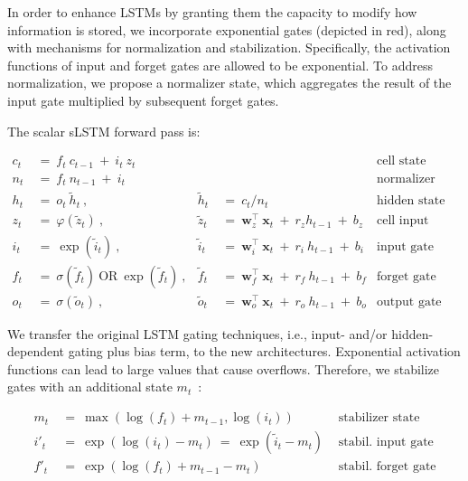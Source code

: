 In order to enhance LSTMs by granting them the capacity to modify how information is stored, we incorporate exponential gates (depicted in red), along with mechanisms for normalization and stabilization. Specifically, the activation functions of input and forget gates are allowed to be exponential. To address normalization, we propose a normalizer state, which aggregates the result of the input gate multiplied by subsequent forget gates.

The scalar sLSTM forward pass is:

\begin{align}
\label{eq:slstmforward}
c_t \ &= \  f_t \ c_{t-1} \ + \ i_t \ z_t & & 
 &\text{cell state} \\
n_t \ &= \  f_t \ n_{t-1} \ + \ i_t  & & 
 &\text{normalizer state} \\
h_t \ &= \ o_t \ \tilde{h}_t \ ,
  &\tilde{h}_t \ &= \ c_t / n_t
&\text{hidden state} \\
z_t \ &= \ \varphi \left( \tilde{z}_t \right) \ , 
  &\tilde{z}_t \ &=  \ \mathbf{w}^\top_{z} \ \mathbf{x}_t \ + \
  r_{z}  h_{t-1} \ + \  b_{z}
  &\text{cell input} \\
i_t \ &= \ \!\exp \left( \tilde{i}_t  \right) \ , 
  &\tilde{i}_t \ &= \ \mathbf{w}^\top_{i} \ \mathbf{x}_t \ + \
  r_{i}  \ h_{t-1} \ + \  b_{i}
  &\text{input gate} \\
f_t \ &= \ \sigma \left(  \tilde{f}_t \right) \ \text{OR} \
\!\exp \left(  \tilde{f}_t \right) \ ,
  &\tilde{f}_t \ &= \ \mathbf{w}^\top_{f} \ \mathbf{x}_t  \ + \
  r_{f}  \ h_{t-1} \ + \  b_{f}
  &\text{forget gate} \\
o_t \ &= \ \sigma \left( \tilde{o}_t \right) \ , 
  &\tilde{o}_t  \ &= \ \mathbf{w}^\top_{o} \ \mathbf{x}_t \ + \
  r_{o}  \ h_{t-1} \ + \  b_{o}
  &\text{output gate} 
\end{align}

We transfer the original LSTM gating techniques, i.e., input- and/or hidden-dependent gating plus bias term, to the new architectures. Exponential activation functions can lead to large values that cause overflows. Therefore, we stabilize gates with an additional state \mbox{$m_t$~\citep{Milakov:18arxiv}}:

\begin{align}
\label{eq:slstmstabil}
m_t \ &= \ \max \left( \log ( f_t ) + m_{t-1} , \log ( i_t ) \right) &\text{stabilizer state} \\
i'_t \ &= \ \!\exp \left( \log \left ( i_t \right) - m_t \right) \ = \ \!\exp \left( \tilde{i}_t - m_t \right) \ \, 
  &\text{stabil. input gate} \\
f'_t \ &= \ \!\exp \left( \log \left( f_t \right) + m_{t-1} - m_t \right) \ \, 
  &\text{stabil. forget gate}
\end{align}

